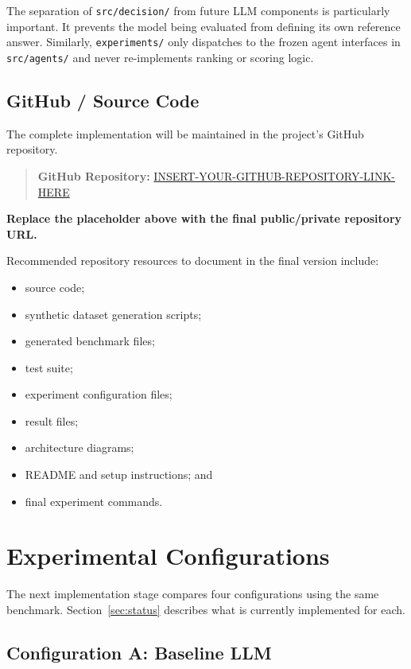 \documentclass[12pt,a4paper]{article}
\begin{document}
The separation of \texttt{src/decision/} from future LLM components is particularly important. It prevents the model being evaluated from defining its own reference answer. Similarly, \texttt{experiments/} only dispatches to the frozen agent interfaces in \texttt{src/agents/} and never re-implements ranking or scoring logic.

\subsection{GitHub / Source Code}

The complete implementation will be maintained in the project's GitHub repository.

\begin{quote}
\textbf{GitHub Repository:} \url{INSERT-YOUR-GITHUB-REPOSITORY-LINK-HERE}
\end{quote}

\textbf{Replace the placeholder above with the final public/private repository URL.}

Recommended repository resources to document in the final version include:
\begin{itemize}
    \item source code;
    \item synthetic dataset generation scripts;
    \item generated benchmark files;
    \item test suite;
    \item experiment configuration files;
    \item result files;
    \item architecture diagrams;
    \item README and setup instructions; and
    \item final experiment commands.
\end{itemize}

\section{Experimental Configurations}

The next implementation stage compares four configurations using the same benchmark. Section~\ref{sec:status} describes what is currently implemented for each.

\subsection{Configuration A: Baseline LLM}
\end{document}

